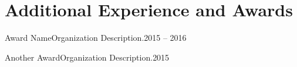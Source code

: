 \section{Additional Experience and Awards}

\resumeSubHeadingListStart

    \resumeSubheading
    {Award Name}{Organization}
    {Description.}{2015 -- 2016}

    \resumeSubheading
    {Another Award}{Organization}
    {Description.}{2015}

\resumeSubHeadingListEnd
